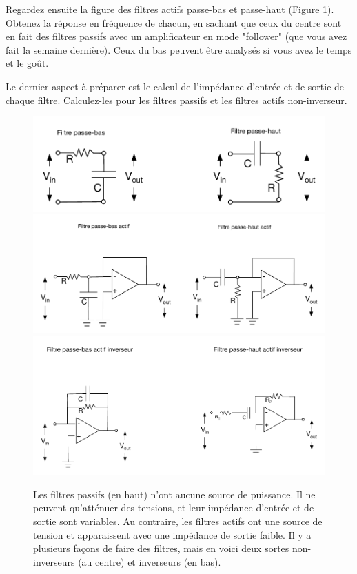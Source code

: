 \documentclass[canadien,12pt,oneside,letterpaper]{article}
\begin{document}
Regardez ensuite la figure des filtres actifs passe-bas et passe-haut (Figure \ref{fig:filtres}).  Obtenez la réponse en fréquence de chacun, en sachant que ceux du centre sont en fait des filtres passifs avec un amplificateur en mode "follower" (que vous avez fait la semaine dernière). Ceux du bas peuvent être analysés si vous avez le temps et le goût.

Le dernier aspect à préparer est le calcul de l'impédance d'entrée et de sortie de chaque filtre. Calculez-les pour les filtres passifs et les filtres actifs non-inverseur.

\begin{figure}[htbp]
   \centering
   \includegraphics[width=15cm]{FP.pdf} 
   \includegraphics[width=15cm]{FANI.pdf} 
   \includegraphics[width=15cm]{FAI.pdf} 
   \caption{Les filtres passifs (en haut) n'ont aucune source de puissance.  Il ne peuvent qu'atténuer des tensions, et leur impédance d'entrée et de sortie sont variables.  Au contraire, les filtres actifs ont une source de tension et apparaissent avec une impédance de sortie faible. Il y a plusieurs façons de faire des filtres, mais en voici deux sortes non-inverseurs (au centre) et inverseurs (en bas).}
   \label{fig:filtres}
\end{figure}
\end{document}

